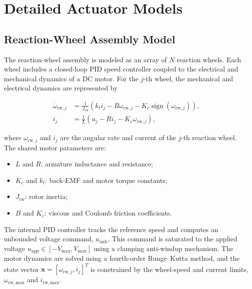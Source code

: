 \section{Detailed Actuator Models}
\label{app:adcs_detailed_actuator_models}

\subsection{Reaction-Wheel Assembly Model}
\label{app:adcs_reaction_wheel_model}

The reaction-wheel assembly is modeled as an array of \(N\) reaction wheels. Each wheel includes a closed-loop PID speed controller coupled to the electrical and mechanical dynamics of a DC motor. For the \(j\)-th wheel, the mechanical and electrical dynamics are represented by

\begin{align}
    \dot{\omega}_{\mathrm{rw},j}
    &=
    \frac{1}{J_{\mathrm{rw}}}
    \left(
        k_t i_j
        -
        B\omega_{\mathrm{rw},j}
        -
        K_c
        \operatorname{sign}(\omega_{\mathrm{rw},j})
    \right),
    \label{eq:app_adcs_rw_mechanical} \\
    \dot{i}_{j}
    &=
    \frac{1}{L}
    \left(
        u_j
        -
        R i_j
        -
        K_e\omega_{\mathrm{rw},j}
    \right),
    \label{eq:app_adcs_rw_electrical}
\end{align}

where \(\omega_{\mathrm{rw},j}\) and \(i_j\) are the angular rate and current of the \(j\)-th reaction wheel. The shared motor parameters are:

\begin{itemize}
    \item \(L\) and \(R\): armature inductance and resistance;
    \item \(K_e\) and \(k_t\): back-EMF and motor torque constants;
    \item \(J_{\mathrm{rw}}\): rotor inertia;
    \item \(B\) and \(K_c\): viscous and Coulomb friction coefficients.
\end{itemize}

The internal PID controller tracks the reference speed and computes an unbounded voltage command, \(u_{\mathrm{unb}}\). This command is saturated to the applied voltage \(u_{\mathrm{app}}\in[-V_{\max},V_{\max}]\) using a clamping anti-windup mechanism. The motor dynamics are solved using a fourth-order Runge--Kutta method, and the state vector \(\mathbf{x}=[\omega_{\mathrm{rw},j}, i_j]^T\) is constrained by the wheel-speed and current limits, \(\omega_{\mathrm{rw,max}}\) and \(i_{\mathrm{rw,max}}\).

